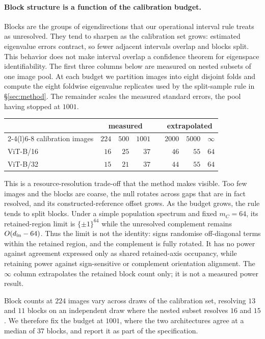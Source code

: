 \paragraph{Block structure is a function of the calibration budget.}
Blocks are the groups of eigendirections that our operational interval rule treats as unresolved.
They tend to sharpen as the calibration set grows: estimated eigenvalue errors contract, so fewer
adjacent intervals overlap and blocks split. This behavior does not make interval overlap a
confidence theorem for eigenspace identifiability.
The first three columns below are measured on nested subsets of one image pool. At each budget we
partition images into eight disjoint folds and compute the eight foldwise eigenvalue replicates
used by the split-sample rule in \S\ref{sec:method}. The remainder scales the measured standard errors,
the pool having stopped at $1001$.

\begin{table}[h]
\centering
\begin{tabular}{@{}lrrrcrrr@{}}
\toprule
& \multicolumn{3}{c}{measured} & & \multicolumn{3}{c}{extrapolated} \\
\cmidrule(r){2-4}\cmidrule(l){6-8}
calibration images & $224$ & $500$ & $1001$ & & $2000$ & $5000$ & $\infty$ \\
\midrule
ViT-B/16 & $16$ & $25$ & $37$ & & $46$ & $55$ & $64$ \\
ViT-B/32 & $15$ & $21$ & $37$ & & $44$ & $55$ & $64$ \\
\bottomrule
\end{tabular}
\end{table}

This is a resource-resolution trade-off that the method makes visible. Too few images and the blocks are coarse, the
null rotates across gaps that are in fact resolved, and its constructed-reference offset grows.
As the budget grows, the rule tends to split blocks. Under a simple population spectrum and fixed
$m_C=64$, its retained-region limit is $\{\pm1\}^{64}$ while the unresolved complement remains
$O(d_{\rm in}-64)$. Thus the limit is not the identity: signs randomise off-diagonal terms within
the retained region, and the complement is fully rotated. It has no power against agreement
expressed only as shared retained-axis occupancy, while retaining power against sign-sensitive or
complement orientation alignment. The $\infty$ column extrapolates the retained block count only;
it is not a measured power result.

Block counts at $224$ images vary across draws of the calibration set, resolving $13$ and $11$
blocks on an independent draw where the nested subset resolves $16$ and $15$. We therefore fix the
budget at $1001$, where the two architectures agree at a median of $37$ blocks, and report it as
part of the specification.

